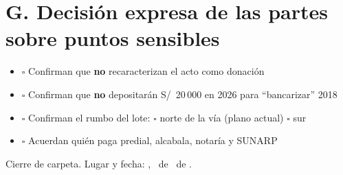 \documentclass[12pt,a4paper]{article}
\begin{document}
\section*{G. Decisión expresa de las partes sobre puntos sensibles}
\begin{itemize}[leftmargin=0.9cm]
\item $\square$ Confirman que \textbf{no} recaracterizan el acto como donación
\item $\square$ Confirman que \textbf{no} depositarán S/\ 20\,000 en 2026 para ``bancarizar'' 2018
\item $\square$ Confirman el rumbo del lote: \quad $\square$ norte de la vía (plano actual) \quad $\square$ sur
\item $\square$ Acuerdan quién paga predial, alcabala, notaría y SUNARP
\end{itemize}

\vspace{0.4em}
\noindent Cierre de carpeta. Lugar y fecha: \LugarOtorgamiento, \DiaOtorgamiento\ de \MesOtorgamiento\ de \AnioOtorgamiento.

\vspace{0.2em}
\end{document}
